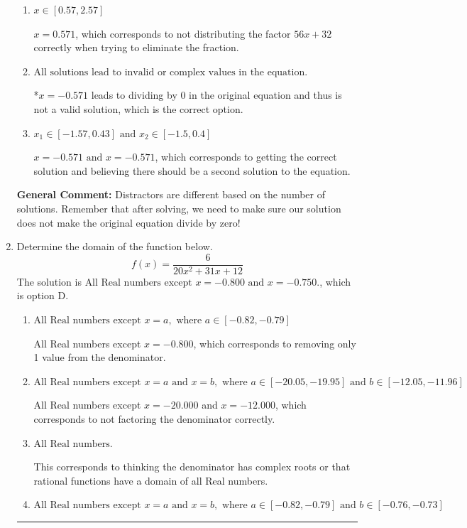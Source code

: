 \documentclass{extbook}[14pt]
\newcommand{\litem}[1]{\item #1

\rule{\textwidth}{0.4pt}}
\begin{document}
\begin{enumerate}
{\begin{enumerate}[label=\Alph*.]
$x = -0.571$, which corresponds to not checking if this value leads to dividing by 0 in the original equation and thus is not a valid solution.
\item \( x \in [0.57,2.57] \)

$x = 0.571$, which corresponds to not distributing the factor $56x + 32$ correctly when trying to eliminate the fraction.
\item \( \text{All solutions lead to invalid or complex values in the equation.} \)

*$x = -0.571$ leads to dividing by 0 in the original equation and thus is not a valid solution, which is the correct option.
\item \( x_1 \in [-1.57, 0.43] \text{ and } x_2 \in [-1.5,0.4] \)

$x = -0.571 \text{ and } x = -0.571$, which corresponds to getting the correct solution and believing there should be a second solution to the equation.
\end{enumerate}

\textbf{General Comment:} Distractors are different based on the number of solutions. Remember that after solving, we need to make sure our solution does not make the original equation divide by zero!
}
\litem{
Determine the domain of the function below.
\[ f(x) = \frac{6}{20x^{2} +31 x + 12} \]
The solution is \( \text{All Real numbers except } x = -0.800 \text{ and } x = -0.750. \), which is option D.\begin{enumerate}[label=\Alph*.]
\item \( \text{All Real numbers except } x = a, \text{ where } a \in [-0.82, -0.79] \)

All Real numbers except $x = -0.800$, which corresponds to removing only 1 value from the denominator.
\item \( \text{All Real numbers except } x = a \text{ and } x = b, \text{ where } a \in [-20.05, -19.95] \text{ and } b \in [-12.05, -11.96] \)

All Real numbers except $x = -20.000$ and $x = -12.000$, which corresponds to not factoring the denominator correctly.
\item \( \text{All Real numbers.} \)

This corresponds to thinking the denominator has complex roots or that rational functions have a domain of all Real numbers.
\item \( \text{All Real numbers except } x = a \text{ and } x = b, \text{ where } a \in [-0.82, -0.79] \text{ and } b \in [-0.76, -0.73] \)


\end{enumerate}}
\end{enumerate}
\end{document}
